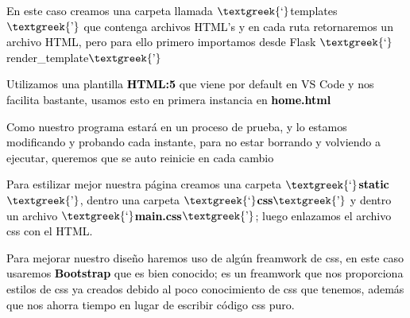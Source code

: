 \documentclass[a4paper]{article}
\begin{document}
{
\textcolor{black}{En este caso creamos una carpeta llamada $\text{\textgreek{‘}}$templates$\text{\textgreek{’}}$ que
contenga archivos HTML's y en cada ruta retornaremos un archivo HTML, pero para ello primero importamos desde Flask
$\text{\textgreek{‘}}$render\_template$\text{\textgreek{’}}$}}




\centering
{}
\par

\bigskip

{
\textcolor{black}{Utilizamos una plantilla }\textbf{\textcolor{black}{HTML:5}}\textcolor{black}{ que viene por default
en VS Code y nos facilita bastante, usamos esto en primera instancia en }\textbf{\textcolor{black}{home.html}}}


\bigskip

{
\textcolor{black}{Como nuestro programa estará en un proceso de prueba, y lo estamos modificando y probando cada
instante, para no estar borrando y volviendo a ejecutar, queremos que se auto reinicie en cada cambio}}





\bigskip


\bigskip

{
\textcolor{black}{Para estilizar mejor nuestra página creamos una carpeta
$\text{\textgreek{‘}}$}\textbf{\textcolor{black}{static$\text{\textgreek{’}}$}}\textcolor{black}{, dentro una carpeta
$\text{\textgreek{‘}}$}\textbf{\textcolor{black}{css$\text{\textgreek{’}}$}}\textcolor{black}{ y dentro un archivo
$\text{\textgreek{‘}}$}\textbf{\textcolor{black}{main.css$\text{\textgreek{’}}$}}\textcolor{black}{; luego enlazamos el
archivo css con el HTML.}}


\bigskip

{
\textcolor{black}{Para mejorar nuestro diseño haremos uso de algún freamwork de css, en este caso usaremos
}\textbf{\textcolor{black}{Bootstrap}}\textcolor{black}{ que es bien conocido; es un freamwork que nos proporciona
estilos de css ya creados debido al poco conocimiento de css que tenemos, además que nos ahorra tiempo en lugar de
escribir código css puro.}}
\end{document}

